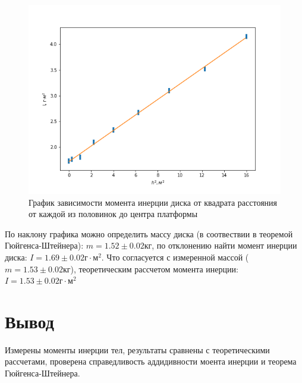 \documentclass[a4paper,12pt]{article} %
\begin{document}
\begin{figure}[h!]
\begin{center}
\includegraphics[width=\textwidth]{График}
\end{center}
\caption{График зависимости момента инерции диска от квадрата расстояния от каждой из половинок до центра платформы} \label{график}
\end{figure}


По наклону графика можно определить массу диска (в соотвествии в теоремой Гюйгенса-Штейнера): $m = 1.52 \pm 0.02 $кг, по отклонению найти момент инерции диска: $I = 1.69 \pm 0.02 \text{г}\cdot \text{м}^2$. Что согласуется с измеренной массой ($m = 1.53 \pm 0.02 $кг), теоретическим рассчетом момента инерции: $I = 1.53 \pm 0.02 \text{г}\cdot \text{м}^2$


\section{Вывод}
Измерены моменты инерции тел, результаты сравнены с теоретическими рассчетами, проверена справедливость аддидивности моента инерции и теорема Гюйгенса-Штейнера.
\end{document}
